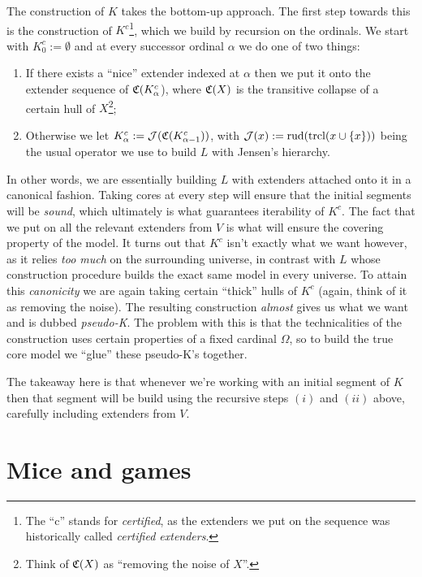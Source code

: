 \documentclass[../../main]{subfiles}
\begin{document}
\qquad The construction of $K$ takes the bottom-up approach. The first step towards this is the construction of $K^c$\footnote{The ``c'' stands for \textit{certified}, as the extenders we put on the sequence was historically called \textit{certified extenders}.}, which we build by recursion on the ordinals. We start with $K^c_0 := \emptyset$ and at every successor ordinal $\alpha$ we do one of two things:
\begin{enumerate}
  \item If there exists a ``nice'' extender indexed at $\alpha$ then we put it onto the extender sequence of $\mathfrak C(K^c_\alpha$), where $\mathfrak C(X)$ is the transitive collapse of a certain hull of $X$\footnote{Think of $\mathfrak C(X)$ as ``removing the noise of $X$''.};
  \item Otherwise we let $K^c_\alpha := \operatorname{\mathcal J}(\mathfrak C(K^c_{\alpha-1}))$, with $\operatorname{\mathcal J}(x):=\text{rud}(\operatorname{trcl}(x\cup\{x\}))$ being the usual operator we use to build $L$ with Jensen's hierarchy.\\
\end{enumerate}

In other words, we are essentially building $L$ with extenders attached onto it in a canonical fashion. Taking cores at every step will ensure that the initial segments will be \textit{sound}, which ultimately is what guarantees iterability of $K^c$. The fact that we put on all the relevant extenders from $V$ is what will ensure the covering property of the model. It turns out that $K^c$ isn't exactly what we want however, as it relies \textit{too much} on the surrounding universe, in contrast with $L$ whose construction procedure builds the exact same model in every universe. To attain this \textit{canonicity} we are again taking certain ``thick'' hulls of $K^c$ (again, think of it as removing the noise). The resulting construction \textit{almost} gives us what we want and is dubbed \textit{pseudo-K}. The problem with this is that the technicalities of the construction uses certain properties of a fixed cardinal $\Omega$, so to build the true core model we ``glue'' these pseudo-K's together.

\qquad The takeaway here is that whenever we're working with an initial segment of $K$ then that segment will be build using the recursive steps $(i)$ and $(ii)$ above, carefully including extenders from $V$.


\section{Mice and games}
\end{document}
